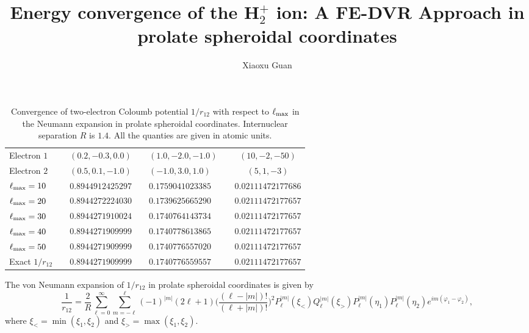 \documentclass[a4paper,12pt]{article}
\begin{document}
\title{\bf Energy convergence of the H$_2^+$ ion: A FE-DVR Approach in prolate
spheroidal coordinates}
\author{Xiaoxu Guan}


\noindent


\begin{table}[ht]
\caption{\label{tab:energy+} Convergence of two-electron Coloumb potential
$1/r_{12}$ with respect to $\ell_{\rm max}$ in the Neumann expansion in
prolate spheroidal coordinates. Internuclear separation $R$ is $1.4$. All the
quanties are given in atomic units.}
\begin{tabular}{lcllllc}
\hline\hline
Electron $1$&   & $(0.2,-0.3,0.0)$& &  $(1.0,-2.0,-1.0)$& &  $(10,-2,-50)$ \\
Electron $2$&   & $(0.5,0.1,-1.0)$&  & $(-1.0,3.0,1.0)$& &$(5,1,-3)$   \\ \hline
$\ell_{\rm max}=10$ & & $0.8944912425297$& & $0.1759041023385$& &
                       $0.02111472177686$      \\
$\ell_{\rm max}=20$ &  & $0.8944272224030$& &  $0.1739625665290$& & 
		       $0.02111472177657$   \\
$\ell_{\rm max}=30$&   & $0.8944271910024$& & $0.1740764143734$&&
                       $0.02111472177657$  \\
$\ell_{\rm max}=40$&   & $0.8944271909999$& & $0.1740778613865$& &
                       $0.02111472177657$  \\
$\ell_{\rm max}=50$&  & $0.8944271909999$&& $0.1740776557020$& &
                       $0.02111472177657$\\   \hline
Exact $1/r_{12}$&   & $0.8944271909999$& &  $0.1740776559557$&&
$0.02111472177657$
  \\ \hline\hline
\end{tabular}
\end{table}
The von Neumann expansion of $1/r_{12}$ in prolate spheroidal coordinates is
given by
\begin{equation}
\frac{1}{r_{12}}=
\frac{2}{R}\sum_{\ell=0}^{\infty}\sum_{m=-\ell}^{\ell}(-1)^{|m|}(2\ell+1)
\bigg(\frac{(\ell-|m|)!}{(\ell+|m|)!} \bigg)^2
P_{\ell}^{|m|}(\xi_<)Q_{\ell}^{|m|}(\xi_>)P_{\ell}^{|m|}(\eta_1)P_{\ell}^{|m|}
(\eta_2)
e^{im(\varphi_1-\varphi_2)},
\end{equation}
where $\xi_{<}=\min(\xi_1,\xi_2)$ and $\xi_{>}=\max(\xi_1,\xi_2)$.
\end{document}
